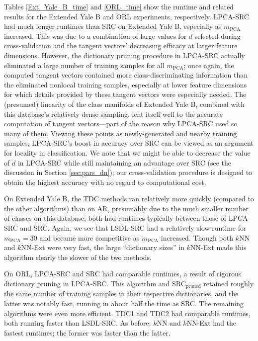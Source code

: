 \documentclass[review]{elsarticle}
\begin{document}
Tables \ref{Ext_Yale_B_time} and \ref{ORL_time} show the runtime and related results for the Extended Yale B and ORL experiments, respectively. LPCA-SRC had much longer runtimes than SRC on Extended Yale B, especially as $m_\mathrm{PCA}$ increased. This was due to a combination of large values for $d$ selected during cross-validation and the tangent vectors' decreasing efficacy at larger feature dimensions. However, the dictionary pruning procedure in LPCA-SRC actually eliminated a large number of training samples for all $m_\mathrm{PCA}$; once again, the computed tangent vectors contained more class-discriminating information than the eliminated nonlocal training samples, especially at lower feature dimensions for which details provided by these tangent vectors were especially needed. The (presumed) linearity of the class manifolds of Extended Yale B, combined with this database's relatively dense sampling, lent itself well to the accurate computation of tangent vectors---part of the reason why LPCA-SRC used so many of them. Viewing these points as newly-generated and nearby training samples, LPCA-SRC's boost in accuracy over SRC can be viewed as an argument for locality in classification. We note that we might be able to decrease the value of $d$ in LPCA-SRC while still maintaining an advantage over SRC (see the discussion in Section \ref{sec:pars_dn}); our cross-validation procedure is designed to obtain the highest accuracy with no regard to computational cost. 

On Extended Yale B, the TDC methods ran relatively more quickly (compared to the other algorithms) than on AR, presumably due to the much smaller number of classes on this database; both had runtimes typically between those of LPCA-SRC and SRC. Again, we see that LSDL-SRC had a relatively slow runtime for $m_\mathrm{PCA} = 30$ and became more competitive as $m_\mathrm{PCA}$ increased. Though both $k$NN and $k$NN-Ext were very fast, the large ``dictionary sizes'' in $k$NN-Ext made this algorithm clearly the slower of the two methods.


On ORL, LPCA-SRC and SRC had comparable runtimes, a result of rigorous dictionary pruning in LPCA-SRC. This algorithm and SRC$_\mathrm{pruned}$ retained roughly the same number of training samples in their respective dictionaries, and the latter was notably fast, running in about half the time as SRC. The remaining algorithms were even more efficient. TDC1 and TDC2 had comparable runtimes, both running faster than LSDL-SRC. As before, $k$NN and $k$NN-Ext had the fastest runtimes; the former was faster than the latter.
\end{document}
